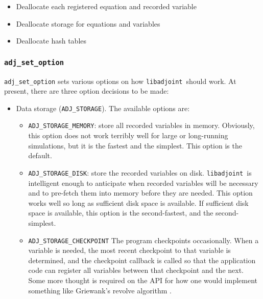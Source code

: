 \documentclass[10pt,authoryear]{elsarticle}
\newcommand{\libadjoint}[0]{{\texttt{libadjoint}}}
\begin{document}
\begin{itemize}
\item Deallocate each registered equation and recorded variable
\item Deallocate storage for equations and variables
\item Deallocate hash tables
\end{itemize}

\subsubsection{\texttt{{adj\_set\_option}}}
\texttt{adj\_set\_option} sets various options on how \libadjoint\ should work. At present, there
are three option decisions to be made:
\begin{itemize}
\item Data storage (\texttt{ADJ\_STORAGE}). The available options are:
  \begin{itemize}
  \item \texttt{ADJ\_STORAGE\_MEMORY}: store all recorded variables in memory. Obviously, this option does not work
  terribly well for large or long-running simulations, but it is the fastest and the simplest. This option is the default.
  \item \texttt{ADJ\_STORAGE\_DISK}: store the recorded variables on disk. 
  \libadjoint\ is intelligent enough to anticipate when recorded variables will be necessary and to pre-fetch
  them into memory before they are needed. This option works well so long as sufficient disk space is available. If sufficient
  disk space is available, this option is the second-fastest, and the second-simplest.
  \item \texttt{ADJ\_STORAGE\_CHECKPOINT} The program checkpoints occasionally. When a variable is needed, the most recent checkpoint
  to that variable is determined, and the checkpoint callback is called so that the application code can register all variables between
  that checkpoint and the next. Some more thought is required on the API for how one would implement something like Griewank's revolve
  algorithm \citep{griewank2000}.
  \end{itemize}


\end{itemize}
\end{document}
